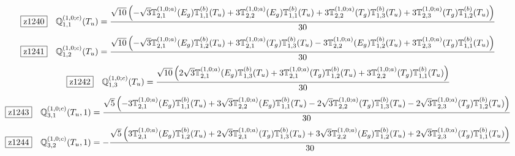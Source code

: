 \documentclass[fleqn,10pt,landscape]{jsarticle}
\begin{document}
\begin{dmath*}
\hspace*{3mm}\fbox{z1240}\quad \mathbb{Q}_{1,1}^{(1,0;c)}(T_{u})=\frac{\sqrt{10} \left(- \sqrt{3} \mathbb{T}_{2,1}^{(1,0;a)}(E_{g}) \mathbb{T}_{1,1}^{(b)}(T_{u}) + 3 \mathbb{T}_{2,2}^{(1,0;a)}(E_{g}) \mathbb{T}_{1,1}^{(b)}(T_{u}) + 3 \mathbb{T}_{2,2}^{(1,0;a)}(T_{g}) \mathbb{T}_{1,3}^{(b)}(T_{u}) + 3 \mathbb{T}_{2,3}^{(1,0;a)}(T_{g}) \mathbb{T}_{1,2}^{(b)}(T_{u})\right)}{30}
\end{dmath*}
\begin{dmath*}
\hspace*{3mm}\fbox{z1241}\quad \mathbb{Q}_{1,2}^{(1,0;c)}(T_{u})=\frac{\sqrt{10} \left(- \sqrt{3} \mathbb{T}_{2,1}^{(1,0;a)}(E_{g}) \mathbb{T}_{1,2}^{(b)}(T_{u}) + 3 \mathbb{T}_{2,1}^{(1,0;a)}(T_{g}) \mathbb{T}_{1,3}^{(b)}(T_{u}) - 3 \mathbb{T}_{2,2}^{(1,0;a)}(E_{g}) \mathbb{T}_{1,2}^{(b)}(T_{u}) + 3 \mathbb{T}_{2,3}^{(1,0;a)}(T_{g}) \mathbb{T}_{1,1}^{(b)}(T_{u})\right)}{30}
\end{dmath*}
\begin{dmath*}
\hspace*{3mm}\fbox{z1242}\quad \mathbb{Q}_{1,3}^{(1,0;c)}(T_{u})=\frac{\sqrt{10} \left(2 \sqrt{3} \mathbb{T}_{2,1}^{(1,0;a)}(E_{g}) \mathbb{T}_{1,3}^{(b)}(T_{u}) + 3 \mathbb{T}_{2,1}^{(1,0;a)}(T_{g}) \mathbb{T}_{1,2}^{(b)}(T_{u}) + 3 \mathbb{T}_{2,2}^{(1,0;a)}(T_{g}) \mathbb{T}_{1,1}^{(b)}(T_{u})\right)}{30}
\end{dmath*}
\begin{dmath*}
\hspace*{3mm}\fbox{z1243}\quad \mathbb{Q}_{3,1}^{(1,0;c)}(T_{u},1)=\frac{\sqrt{5} \left(- 3 \mathbb{T}_{2,1}^{(1,0;a)}(E_{g}) \mathbb{T}_{1,1}^{(b)}(T_{u}) + 3 \sqrt{3} \mathbb{T}_{2,2}^{(1,0;a)}(E_{g}) \mathbb{T}_{1,1}^{(b)}(T_{u}) - 2 \sqrt{3} \mathbb{T}_{2,2}^{(1,0;a)}(T_{g}) \mathbb{T}_{1,3}^{(b)}(T_{u}) - 2 \sqrt{3} \mathbb{T}_{2,3}^{(1,0;a)}(T_{g}) \mathbb{T}_{1,2}^{(b)}(T_{u})\right)}{30}
\end{dmath*}
\begin{dmath*}
\hspace*{3mm}\fbox{z1244}\quad \mathbb{Q}_{3,2}^{(1,0;c)}(T_{u},1)=- \frac{\sqrt{5} \left(3 \mathbb{T}_{2,1}^{(1,0;a)}(E_{g}) \mathbb{T}_{1,2}^{(b)}(T_{u}) + 2 \sqrt{3} \mathbb{T}_{2,1}^{(1,0;a)}(T_{g}) \mathbb{T}_{1,3}^{(b)}(T_{u}) + 3 \sqrt{3} \mathbb{T}_{2,2}^{(1,0;a)}(E_{g}) \mathbb{T}_{1,2}^{(b)}(T_{u}) + 2 \sqrt{3} \mathbb{T}_{2,3}^{(1,0;a)}(T_{g}) \mathbb{T}_{1,1}^{(b)}(T_{u})\right)}{30}
\end{dmath*}
\end{document}
